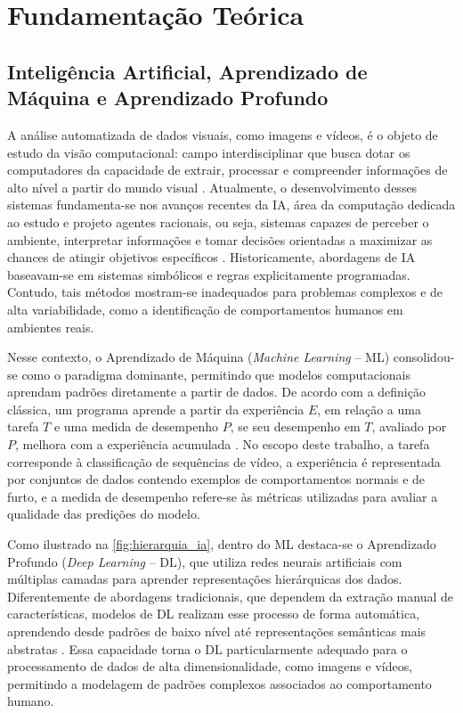 \documentclass[12pt, %
openright, 
oneside, %
a4paper,    %
brazil]{facom-ufu-abntex2}
\begin{document}


\chapter[Fundamentação Teórica]{Fundamentação Teórica}
\section[Inteligência Artificial, Aprendizado de Máquina e Aprendizado Profundo]{Inteligência Artificial, Aprendizado de Máquina e Aprendizado Profundo}

A análise automatizada de dados visuais, como imagens e vídeos, é o objeto de estudo da visão computacional: campo interdisciplinar que busca dotar os computadores da capacidade de extrair, processar e compreender informações de alto nível a partir do mundo visual \cite{vision}. Atualmente, o desenvolvimento desses sistemas fundamenta-se nos avanços recentes da IA, área da computação dedicada ao estudo e projeto  agentes racionais, ou seja, sistemas capazes de perceber o ambiente, interpretar informações e tomar decisões orientadas a maximizar as chances de atingir objetivos específicos \cite{ai-modern}. Historicamente, abordagens de IA baseavam-se em sistemas simbólicos e regras explicitamente programadas. Contudo, tais métodos mostram-se inadequados para problemas complexos e de alta variabilidade, como a identificação de comportamentos humanos em ambientes reais.

Nesse contexto, o Aprendizado de Máquina (\textit{Machine Learning} – ML) consolidou-se como o paradigma dominante, permitindo que modelos computacionais aprendam padrões diretamente a partir de dados. De acordo com a definição clássica, um programa aprende a partir da experiência $ E $, em relação a uma tarefa $ T $ e uma medida de desempenho $ P $, se seu desempenho em $ T $, avaliado por $ P $, melhora com a experiência acumulada \cite{mitchell}. No escopo deste trabalho, a tarefa corresponde à classificação de sequências de vídeo, a experiência é representada por conjuntos de dados contendo exemplos de comportamentos normais e de furto, e a medida de desempenho refere-se às métricas utilizadas para avaliar a qualidade das predições do modelo.

Como ilustrado na \autoref{fig:hierarquia_ia}, dentro do ML destaca-se o Aprendizado Profundo (\textit{Deep Learning} – DL), que utiliza redes neurais artificiais com múltiplas camadas para aprender representações hierárquicas dos dados. Diferentemente de abordagens tradicionais, que dependem da extração manual de características, modelos de DL realizam esse processo de forma automática, aprendendo desde padrões de baixo nível até representações semânticas mais abstratas \cite{goodfellow}. Essa capacidade torna o DL particularmente adequado para o processamento de dados de alta dimensionalidade, como imagens e vídeos, permitindo a modelagem de padrões complexos associados ao comportamento humano.
\end{document}
